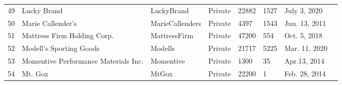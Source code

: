\documentclass[9pt,twoside,lineno]{pnas-new}
\begin{document}
\begin{longtable}{llllllll}
49          & Lucky Brand                                                                     & LuckyBrand                                                          & Private          & 22882              & 1527               & July 3, 2020                                                                                                                          \\
50          & Marie Callender's                                                               & MarieCallenders                                                     & Private          & 4397               & 1543               & Jun. 13, 2011                                                                                                                         \\
51          & Mattress Firm Holding Corp.          & MattressFirm                                                        & Private          & 47200              & 554                & Oct. 5, 2018                                                                                                                       \\
52          & Modell's Sporting Goods                                                         & Modells                                                             & Private          & 21717              & 5225               & Mar. 11, 2020                                                                                                                        \\
53          & Momentive Performance Materials Inc. & Momentive                                                           & Private          & 1300               & 35                 & Apr.13, 2014                                                                                                                        \\
54          & Mt. Gox                                                                         & MtGox                                                               & Private          & 22200              & 1               & Feb. 28, 2014                                                                                                                     \\

\end{longtable}
\end{document}
